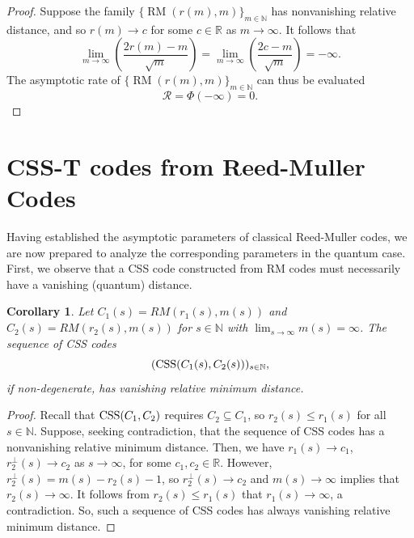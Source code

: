 \documentclass{amsart}
\newtheorem{corollary}[theorem]{Corollary}
\theoremstyle{definition}
\newcommand{\R}{{\mathbb{R}}}
\newcommand{\N}{{\mathbb{N}}}
\newcommand{\CSS}{\textnormal{CSS}}
\DeclareMathOperator{\RM}{RM}
\begin{document}
\begin{proof}
Suppose the family $\{\RM(r(m),m)\}_{m\in \N}$ has nonvanishing relative distance, and so $r(m)\to c$ for some $c\in \R$ as $m\to\infty$. It follows that \[\lim_{m \to \infty} \left (\frac{2r(m) - m}{\sqrt{m}}\right) = \lim_{m\to \infty} \left( \frac{2c-m}{\sqrt{m}} \right)= -\infty.\] The asymptotic rate of $\{\RM(r(m),m)\}_{m\in \N}$ can thus be evaluated 
\[ \mathcal{R} = \Phi(-\infty) = 0. \]
\end{proof}

\section{CSS-T codes from Reed-Muller Codes}\label{s:CSS-T-RM}

Having established the asymptotic parameters of classical Reed-Muller codes, we are now prepared to analyze the corresponding parameters in the quantum case. First, we observe that a CSS code constructed from RM codes must necessarily have a vanishing (quantum) distance.

    

\begin{corollary}
Let $C_1(s)= RM(r_1(s), m(s))$ and $C_2(s)= RM(r_2(s), m(s))$ for $s\in \N$ with $\lim_{s\to \infty}m(s)=\infty$. The sequence of CSS codes \[(\CSS(C_1(s),C_2(s)))_{s\in \N},\] if non-degenerate, has vanishing relative minimum distance.
\end{corollary} 

\begin{proof}
    Recall that $\CSS(C_1,C_2)$ requires $C_2\subseteq C_1$, so $r_2(s) \leq r_1(s)$ for all $s\in\N$. Suppose, seeking contradiction, that the sequence of CSS codes has a nonvanishing relative minimum distance. Then, we have $r_1(s)\to c_1$, $r_2^\perp(s)\to c_2$ as $s\to\infty$, for some $c_1,c_2\in\R$. However, $r_2^\perp(s) = m(s) - r_2(s) - 1$, so $r_2^\perp(s)\to c_2$ and $m(s)\to\infty$ implies that $r_2(s)\to\infty$. It follows from $r_2(s) \leq r_1(s)$ that $r_1(s)\to\infty$, a contradiction. So, such a sequence of CSS codes has always vanishing relative minimum distance.
\end{proof}
\end{document}
